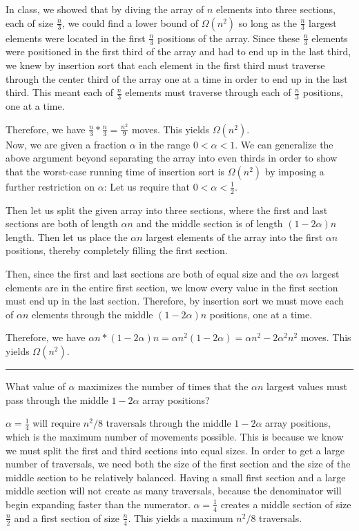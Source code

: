 \documentclass[11pt]{article}
\def\separateline{\medskip\hrule\medskip}
\begin{document}
In class, we showed that by diving the array of $n$ elements into three sections, each of size $\frac{n}{3}$, we could find a lower bound of $\Omega(n^2)$ so long as the $\frac{n}{3}$ largest elements were located in the first $\frac{n}{3}$ positions of the array. Since these $\frac{n}{3}$ elements were positioned in the first third of the array and had to end up in the last third, we knew by insertion sort that each element in the first third must traverse through the center third of the array one at a time in order to end up in the last third. This meant each of $\frac{n}{3}$ elements must traverse through each of $\frac{n}{3}$ positions, one at a time.

Therefore, we have $\frac{n}{3} * \frac{n}{3} = \frac{n^2}{9}$ moves. This yields $\Omega(n^2)$.\\

Now, we are given a fraction $\alpha$ in the range $0 < \alpha < 1$. We can generalize the above argument beyond separating the array into even thirds in order to show that the worst-case running time of insertion sort is $\Omega(n^2)$ by imposing a further restriction on $\alpha$: Let us require that $0 < \alpha < \frac{1}{2}$.

Then let us split the given array into three sections, where the first and last sections are both of length $\alpha n$ and the middle section is of length $(1 - 2\alpha)n$ length. Then let us place the $\alpha n$ largest elements of the array into the first $\alpha n$ positions, thereby completely filling the first section.

Then, since the first and last sections are both of equal size and the $\alpha n$ largest elements are in the entire first section, we know every value in the first section must end up in the last section. Therefore, by insertion sort we must move each of $\alpha n$ elements through the middle $(1 - 2\alpha)n$ positions, one at a time.

Therefore, we have $\alpha n * (1 - 2\alpha)n = \alpha n^2(1 - 2\alpha) = \alpha n^2 - 2\alpha^2 n^2$ moves. This yields $\Omega(n^2)$.\\

\separateline
What value of $\alpha$ maximizes the number of times that the $\alpha n$ largest values must pass through the middle $1 - 2\alpha$ array positions?

$\alpha = \frac{1}{4}$ will require $n^2/8$ traversals through the middle $1 - 2\alpha$ array positions, which is the maximum number of movements possible. This is because we know we must split the first and third sections into equal sizes. In order to get a large number of traversals, we need both the size of the first section and the size of the middle section to be relatively balanced. Having a small first section and a large middle section will not create as many traversals, because the denominator will begin expanding faster than the numerator. $\alpha = \frac{1}{4}$ creates a middle section of size $\frac{n}{2}$ and a first section of size $\frac{n}{4}$. This yields a maximum $n^2/8$ traversals.
\end{document}
